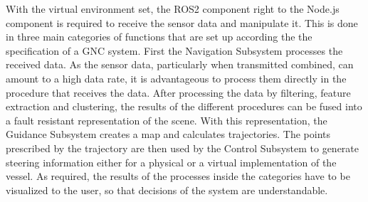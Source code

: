 With the virtual environment set, the ROS2 component right to the Node.js component is required to receive the sensor data and manipulate it. This is done in three main categories of functions that are set up according the the specification of a \ac{GNC} system. First the Navigation Subsystem processes the received data. As the sensor data, particularly when transmitted combined, can amount to a high data rate, it is advantageous to process them directly in the procedure that receives the data.
After processing the data by filtering, feature extraction and clustering, the results of the different procedures can be fused into a fault resistant representation of the scene. With this representation, the Guidance Subsystem creates a map and calculates trajectories. The points prescribed by the trajectory are then used by the Control Subsystem to generate steering information either for a physical or a virtual implementation of the vessel. As required, the results of the processes inside the categories have to be visualized to the user, so that decisions of the system are understandable.

